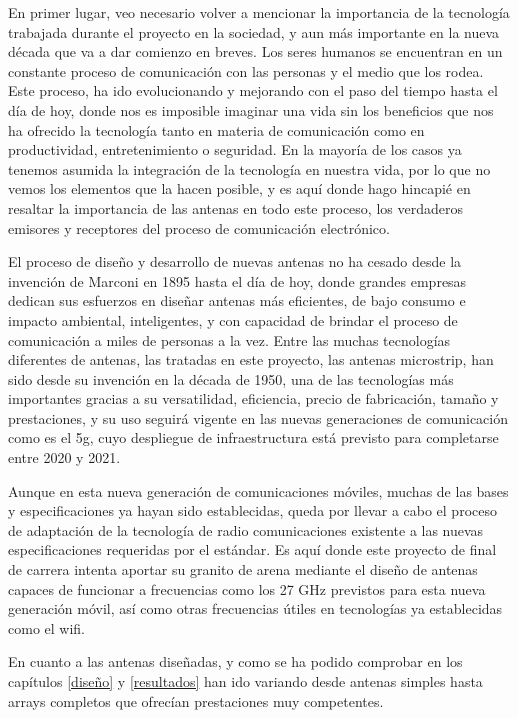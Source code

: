 \par En primer lugar, veo necesario volver a mencionar la importancia de la tecnología trabajada durante el proyecto en la sociedad, y aun más importante en la nueva década que va a dar comienzo en breves. Los seres humanos se encuentran en un constante proceso de comunicación con las personas y el medio que los rodea. Este proceso, ha ido evolucionando y mejorando con el paso del tiempo hasta el día de hoy, donde nos es imposible imaginar una vida sin los beneficios que nos ha ofrecido la tecnología tanto en materia de comunicación como en productividad, entretenimiento o seguridad. En la mayoría de los casos ya tenemos asumida la integración de la tecnología en nuestra vida, por lo que no vemos los elementos que la hacen posible, y es aquí donde hago hincapié en resaltar la importancia de las antenas en todo este proceso, los verdaderos emisores y receptores del proceso de comunicación electrónico. 
\\
\par El proceso de diseño y desarrollo de nuevas antenas no ha cesado desde la invención de Marconi en 1895 hasta el día de hoy, donde grandes empresas dedican sus esfuerzos en diseñar antenas más eficientes, de bajo consumo e impacto ambiental, inteligentes, y con capacidad de brindar el proceso de comunicación a miles de personas a la vez. Entre las muchas tecnologías diferentes de antenas, las tratadas en este proyecto, las antenas microstrip, han sido desde su invención en la década de 1950, una de las tecnologías más importantes gracias a su versatilidad, eficiencia, precio de fabricación, tamaño y prestaciones, y su uso seguirá vigente en las nuevas generaciones de comunicación como es el \gls{5g}, cuyo despliegue de infraestructura está previsto para completarse entre 2020 y 2021. 
\\
\par Aunque en esta nueva generación de comunicaciones móviles, muchas de las bases y especificaciones ya hayan sido establecidas, queda por llevar a cabo el proceso de adaptación de la tecnología de radio comunicaciones existente a las nuevas especificaciones requeridas por el estándar. Es aquí donde este proyecto de final de carrera intenta aportar su granito de arena mediante el diseño de antenas capaces de funcionar a frecuencias como los 27 GHz previstos para esta nueva generación móvil, así como otras frecuencias útiles en tecnologías ya establecidas como el \gls{wifi}.
\\
\par En cuanto a las antenas diseñadas, y como se ha podido comprobar en los capítulos \ref{diseño} y \ref{resultados} han ido variando desde antenas simples hasta arrays completos que ofrecían prestaciones muy competentes. 